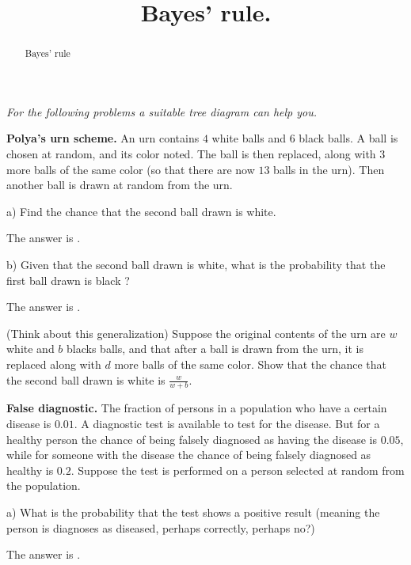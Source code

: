 \documentclass{ximera}
\title{Bayes' rule.}
\begin{document}
\begin{abstract}
Bayes' rule
\end{abstract}
\maketitle

{\it For the following problems a suitable tree diagram can help you.}\vspace{.25cm}

{\bf Polya's urn scheme.} An urn contains $4$ white balls and $6$ black balls. A ball is chosen at random, and its color noted. The ball is then replaced, along with $3$ more balls of the same color (so that there are now $13$ balls in the urn). Then another ball is drawn at random from the urn.

\begin{question}
a) Find the chance that the second ball drawn is white.
     \begin{solution}
          The answer is .
      \end{solution}
\end{question}

\begin{question}
b) Given that the second ball drawn is white, what is the probability that the first ball drawn is black ?
     \begin{solution}
          The answer is .
      \end{solution}
\end{question}
      
(Think about this generalization) Suppose the original contents of the urn are $w$ white and $b$ blacks balls, and that after a ball is drawn from the urn, it is replaced along with $d$ more balls of the same color. Show that the chance that the second ball drawn is white is $\frac{w}{w+b}$. \vspace{.35cm}

{\bf False diagnostic.} The fraction of persons in a population who have a certain disease is $0.01$. A diagnostic test is available to test for the disease. But for a healthy person the chance of being falsely diagnosed as having the disease is $0.05$, while for someone with the disease the chance of being falsely diagnosed as healthy is $0.2$. Suppose the test is performed on a person selected at random from the population.

\begin{question}
a) What is the probability that the test shows a positive result (meaning the person is diagnoses as diseased, perhaps correctly, perhaps no?)
     \begin{solution}
          The answer is  .
      \end{solution}
\end{question}
\end{document}
